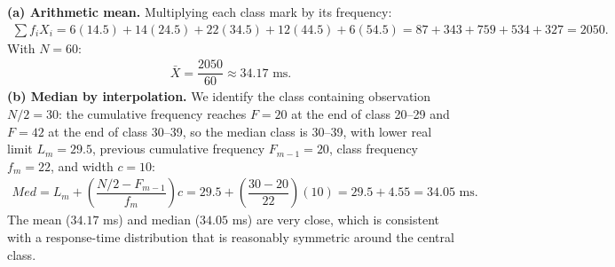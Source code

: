 \begin{solproblema}[prob:32476e7]
	\textbf{(a) Arithmetic mean.} Multiplying each class mark by its frequency:
	\begin{align}
		\sum f_iX_i = 6(14.5)+14(24.5)+22(34.5)+12(44.5)+6(54.5) = 87+343+759+534+327 = 2050.
	\end{align}
	With $N=60$:
	\begin{align}
		\bar{X} = \dfrac{2050}{60} \approx 34.17 \text{ ms.}
	\end{align}
	\textbf{(b) Median by interpolation.} We identify the class containing observation $N/2=30$: the cumulative frequency reaches $F=20$ at the end of class 20--29 and $F=42$ at the end of class 30--39, so the median class is 30--39, with lower real limit $L_m=29.5$, previous cumulative frequency $F_{m-1}=20$, class frequency $f_m=22$, and width $c=10$:
	\begin{align}
		Med = L_m + \left( \dfrac{N/2 - F_{m-1}}{f_m} \right)c = 29.5 + \left( \dfrac{30-20}{22} \right)(10) = 29.5 + 4.55 = 34.05 \text{ ms.}
	\end{align}
	The mean ($34.17$ ms) and median ($34.05$ ms) are very close, which is consistent with a response-time distribution that is reasonably symmetric around the central class.
\end{solproblema}

